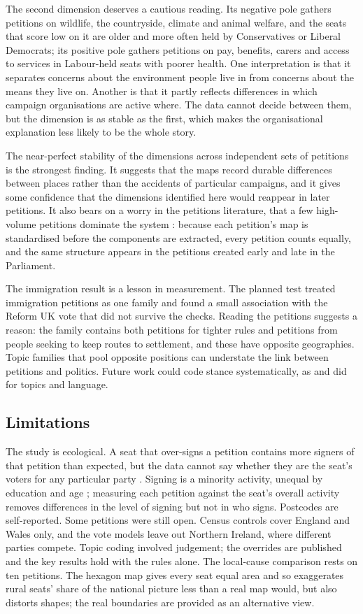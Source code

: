 \documentclass[11pt,a4paper]{article}
\begin{document}
The second dimension deserves a cautious reading. Its negative pole gathers petitions on wildlife, the countryside, climate and animal welfare, and the seats that score low on it are older and more often held by Conservatives or Liberal Democrats; its positive pole gathers petitions on pay, benefits, carers and access to services in Labour-held seats with poorer health. One interpretation is that it separates concerns about the environment people live in from concerns about the means they live on. Another is that it partly reflects differences in which campaign organisations are active where. The data cannot decide between them, but the dimension is as stable as the first, which makes the organisational explanation less likely to be the whole story.

The near-perfect stability of the dimensions across independent sets of petitions is the strongest finding. It suggests that the maps record durable differences between places rather than the accidents of particular campaigns, and it gives some confidence that the dimensions identified here would reappear in later petitions. It also bears on a worry in the petitions literature, that a few high-volume petitions dominate the system \citep{jungherr2010}: because each petition's map is standardised before the components are extracted, every petition counts equally, and the same structure appears in the petitions created early and late in the Parliament.

The immigration result is a lesson in measurement. The planned test treated immigration petitions as one family and found a small association with the Reform UK vote that did not survive the checks. Reading the petitions suggests a reason: the family contains both petitions for tighter rules and petitions from people seeking to keep routes to settlement, and these have opposite geographies. Topic families that pool opposite positions can understate the link between petitions and politics. Future work could code stance systematically, as \citet{vidgen2020} and \citet{hagen2016} did for topics and language.

\subsection{Limitations}
The study is ecological. A seat that over-signs a petition contains more signers of that petition than expected, but the data cannot say whether they are the seat's voters for any particular party \citep{robinson1950}. Signing is a minority activity, unequal by education and age \citep{schlozman2010,escher2017}; measuring each petition against the seat's overall activity removes differences in the level of signing but not in who signs. Postcodes are self-reported. Some petitions were still open. Census controls cover England and Wales only, and the vote models leave out Northern Ireland, where different parties compete. Topic coding involved judgement; the overrides are published and the key results hold with the rules alone. The local-cause comparison rests on ten petitions. The hexagon map gives every seat equal area and so exaggerates rural seats' share of the national picture less than a real map would, but also distorts shapes; the real boundaries are provided as an alternative view.
\end{document}
